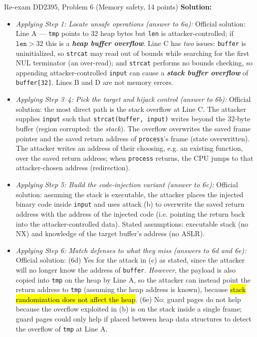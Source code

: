 \documentclass[12pt, a4paper]{article}
\newcommand{\term}[1]{\textbf{\textit{#1}}}        %
\newcommand{\imp}[1]{\hl{#1}}                       %
\begin{document}
\begin{practicebox}{Re-exam DD2395, Problem 6 (Memory safety, 14 points)}
\textbf{Solution:}
\begin{itemize}
    \item \textit{Applying Step 1: Locate unsafe operations (answer to 6a):} Official solution: Line A --- \texttt{tmp} points to 32 heap bytes but \texttt{len} is attacker-controlled; if $\texttt{len} > 32$ this is a \term{heap buffer overflow}. Line C has \emph{two} issues: \texttt{buffer} is uninitialized, so \texttt{strcat} may read out of bounds while searching for the first NUL terminator (an over-read); and \texttt{strcat} performs no bounds checking, so appending attacker-controlled \texttt{input} can cause a \term{stack buffer overflow} of \texttt{buffer[32]}. Lines B and D are not memory errors.
    \item \textit{Applying Step 3--4: Pick the target and hijack control (answer to 6b):} Official solution: the most direct path is the stack overflow at Line C. The attacker supplies \texttt{input} such that \texttt{strcat(buffer, input)} writes beyond the 32-byte buffer (region corrupted: the \emph{stack}). The overflow overwrites the saved frame pointer and the saved return address of \texttt{process}'s frame (state overwritten). The attacker writes an address of their choosing, e.g. an existing function, over the saved return address; when \texttt{process} returns, the CPU jumps to that attacker-chosen address (redirection).
    \item \textit{Applying Step 5: Build the code-injection variant (answer to 6c):} Official solution: assuming the stack is executable, the attacker places the injected binary code inside \texttt{input} and uses attack (b) to overwrite the saved return address with the address of the injected code (i.e. pointing the return back into the attacker-controlled data). Stated assumptions: executable stack (no NX) and knowledge of the target buffer's address (no ASLR).
    \item \textit{Applying Step 6: Match defenses to what they miss (answers to 6d and 6e):} Official solution: (6d) Yes for the attack in (c) as stated, since the attacker will no longer know the address of \texttt{buffer}. \emph{However}, the payload is also copied into \texttt{tmp} on the heap by Line A, so the attacker can instead point the return address to \texttt{tmp} (assuming the heap address is known), because \imp{stack randomization does not affect the heap}. (6e) No: guard pages do not help because the overflow exploited in (b) is on the stack inside a single frame; guard pages could only help if placed between heap data structures to detect the overflow of \texttt{tmp} at Line A.

\end{itemize}
\end{practicebox}
\end{document}

